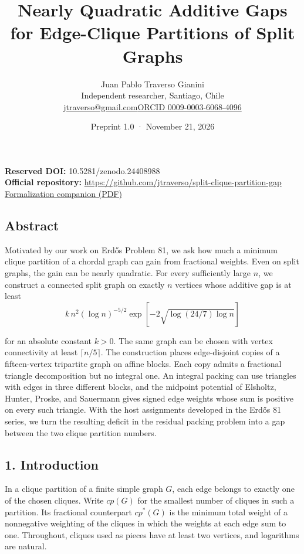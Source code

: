 \documentclass[english,11pt,a4paper]{article}
\title{Nearly Quadratic Additive Gaps for Edge-Clique Partitions of Split Graphs}
\author{Juan Pablo Traverso Gianini\\\small Independent researcher, Santiago, Chile\\\small\href{mailto:jtraverso@gmail.com}{jtraverso@gmail.com}\quad\href{https://orcid.org/0009-0003-6068-4096}{ORCID 0009-0003-6068-4096}}
\date{Preprint 1.0 \enspace · \enspace November 21, 2026}
\begin{document}
\raggedbottom\maketitle
\noindent\textbf{Reserved DOI:} 10.5281/zenodo.24408988\\
\textbf{Official repository:} \url{https://github.com/jtraverso/split-clique-partition-gap}\\
\href{https://github.com/jtraverso/split-clique-partition-gap/blob/main/preprints/SPLITGAP/05_formalization/companion-en.pdf}{Formalization companion (PDF)}
\subsection{Abstract}\label{abstract}

Motivated by our work on Erdős Problem 81, we ask how much a minimum clique partition of a chordal graph can gain from fractional weights. Even on split graphs, the gain can be nearly quadratic. For every sufficiently large \(n\), we construct a connected split graph on exactly \(n\) vertices whose additive gap is at least
\[k\,n^2(\log n)^{-5/2}\exp\!\left[-2\sqrt{\log(24/7)\log n}\right]\]

for an absolute constant \(k>0\). The same graph can be chosen with vertex connectivity at least \(\lceil n/5\rceil\). The construction places edge-disjoint copies of a fifteen-vertex tripartite graph on affine blocks. Each copy admits a fractional triangle decomposition but no integral one. An integral packing can use triangles with edges in three different blocks, and the midpoint potential of Elsholtz, Hunter, Proske, and Sauermann gives signed edge weights whose sum is positive on every such triangle. With the host assignments developed in the Erdős 81 series, we turn the resulting deficit in the residual packing problem into a gap between the two clique partition numbers.

\subsection{1. Introduction}\label{introduction}

In a clique partition of a finite simple graph \(G\), each edge belongs to exactly one of the chosen cliques. Write \(cp(G)\) for the smallest number of cliques in such a partition. Its fractional counterpart \(cp^*(G)\) is the minimum total weight of a nonnegative weighting of the cliques in which the weights at each edge sum to one. Throughout, cliques used as pieces have at least two vertices, and logarithms are natural.
\end{document}
